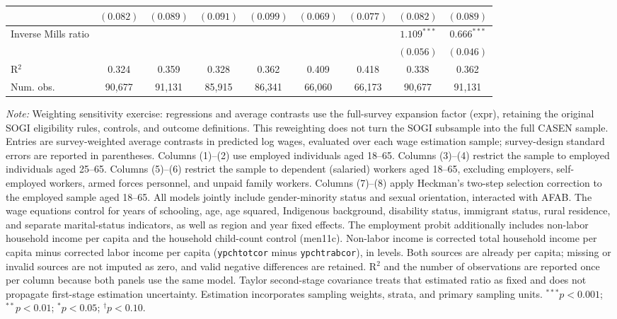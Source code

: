 \begin{table}[htpb]
{\begin{tabular}{l c c c c c c c c}
 & $(0.082)$ & $(0.089)$ & $(0.091)$ & $(0.099)$ & $(0.069)$ & $(0.077)$ & $(0.082)$ & $(0.089)$ \\
\hline
Inverse Mills ratio &  &  &  &  &  &  & $1.109^{***}$ & $0.666^{***}$ \\
 &  &  &  &  &  &  & $(0.056)$ & $(0.046)$ \\
\hline
R$^2$ & 0.324 & 0.359 & 0.328 & 0.362 & 0.409 & 0.418 & 0.338 & 0.362 \\
Num. obs. & 90,677 & 91,131 & 85,915 & 86,341 & 66,060 & 66,173 & 90,677 & 91,131 \\
\hline
\end{tabular}%
}
\par\smallskip
\begin{minipage}{\textwidth}\footnotesize
\footnotesize\textit{Note:} Weighting sensitivity exercise: regressions and average contrasts use the full-survey expansion factor (expr), retaining the original SOGI eligibility rules, controls, and outcome definitions. This reweighting does not turn the SOGI subsample into the full CASEN sample. Entries are survey-weighted average contrasts in predicted log wages, evaluated over each wage estimation sample; survey-design standard errors are reported in parentheses. Columns (1)--(2) use employed individuals aged 18--65. Columns (3)--(4) restrict the sample to employed individuals aged 25--65. Columns (5)--(6) restrict the sample to dependent (salaried) workers aged 18--65, excluding employers, self-employed workers, armed forces personnel, and unpaid family workers. Columns (7)--(8) apply Heckman's two-step selection correction to the employed sample aged 18--65. All models jointly include gender-minority status and sexual orientation, interacted with AFAB. The wage equations control for years of schooling, age, age squared, Indigenous background, disability status, immigrant status, rural residence, and separate marital-status indicators, as well as region and year fixed effects. The employment probit additionally includes non-labor household income per capita and the household child-count control (men11c). Non-labor income is corrected total household income per capita minus corrected labor income per capita (\texttt{ypchtotcor} minus \texttt{ypchtrabcor}), in levels. Both sources are already per capita; missing or invalid sources are not imputed as zero, and valid negative differences are retained. R$^2$ and the number of observations are reported once per column because both panels use the same model. Taylor second-stage covariance treats that estimated ratio as fixed and does not propagate first-stage estimation uncertainty. Estimation incorporates sampling weights, strata, and primary sampling units. $^{***}p<0.001$; $^{**}p<0.01$; $^{*}p<0.05$; $^{\dagger}p<0.10$.
\end{minipage}
\end{table}
